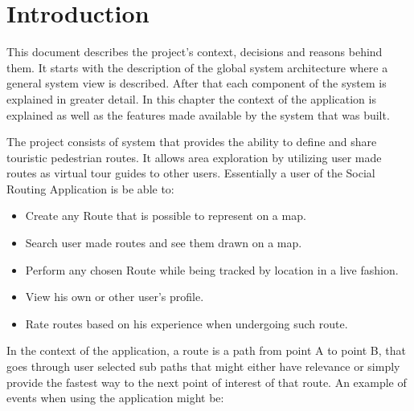 \chapter{Introduction}

    This document describes the project's context, decisions and reasons behind them. It starts with
    the description of the global system architecture where a general system view is described.
    After that each component of the system is explained in greater detail. In this chapter the context of the application is explained as well
    as the features made available by the system that was built.

    The project consists of system that provides the ability to define and share touristic pedestrian routes. It allows
    area exploration by utilizing user made routes as virtual tour guides to other users. 
    Essentially a user of the Social Routing Application is be able to:
    \begin{itemize}
        \item Create any Route that is possible to represent on a map.
        \item Search user made routes and see them drawn on a map.
        \item Perform any chosen Route while being tracked by location in a live fashion.
        \item View his own or other user's profile.
        \item Rate routes based on his experience when undergoing such route.
    \end{itemize}

    In the context of the application, a route is a path from point A to point B, that goes through user selected sub paths
    that might either have relevance or simply provide the fastest way to the next point of interest of that route. 
    An example of events when using the application might be:

